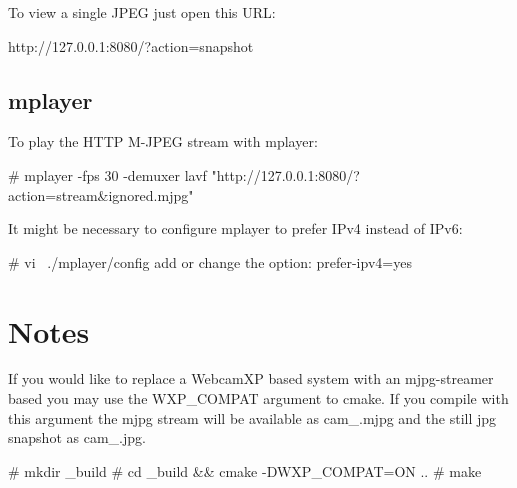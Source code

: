 To view a single J\+P\+E\+G just open this U\+R\+L\+: \begin{DoxyVerb}http://127.0.0.1:8080/?action=snapshot
\end{DoxyVerb}


\subsection*{mplayer }

To play the H\+T\+T\+P M-\/\+J\+P\+E\+G stream with mplayer\+: \begin{DoxyVerb}# mplayer -fps 30 -demuxer lavf "http://127.0.0.1:8080/?action=stream&ignored.mjpg"
\end{DoxyVerb}


It might be necessary to configure mplayer to prefer I\+Pv4 instead of I\+Pv6\+: \begin{DoxyVerb}# vi ~./mplayer/config
add or change the option: prefer-ipv4=yes
\end{DoxyVerb}


\section*{Notes }

If you would like to replace a Webcam\+X\+P based system with an mjpg-\/streamer based you may use the W\+X\+P\+\_\+\+C\+O\+M\+P\+A\+T argument to cmake. If you compile with this argument the mjpg stream will be available as cam\+\_.\+mjpg and the still jpg snapshot as cam\+\_.\+jpg. \begin{DoxyVerb}# mkdir _build
# cd _build && cmake -DWXP_COMPAT=ON ..
# make\end{DoxyVerb}
 